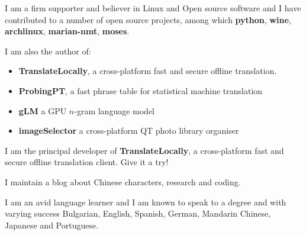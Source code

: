 





\divider\smallskip
{}

\divider\smallskip
{}

\smallskip


I am a firm supporter and believer in Linux and Open source software and I have contributed to a number of open source projects, among which \textbf{python}, \textbf{wine}, 
\textbf{archlinux}, \textbf{marian-nmt}, \textbf{moses}.

I  am also the author of:
\begin{itemize}
    \item \textbf{TranslateLocally}, a cross-platform fast and secure offline translation.
    \item \textbf{ProbingPT}, a fast phrase table for statistical machine translation
    \item \textbf{gLM} a GPU $n$-gram language model
    \item \textbf{imageSelector} a cross-platform QT photo library organiser
\end{itemize}

\divider

I am the principal developer of \textbf{TranslateLocally}, a cross-platform fast and secure offline translation client. Give it a try!

{\footnotesize {} }

\divider


I maintain a blog about Chinese characters, research and coding.

{\footnotesize {}}

\divider

I am an avid language learner and I am known to speak to a degree and with varying success Bulgarian, English, Spanish, German, Mandarin Chinese, Japanese and Portuguese.

